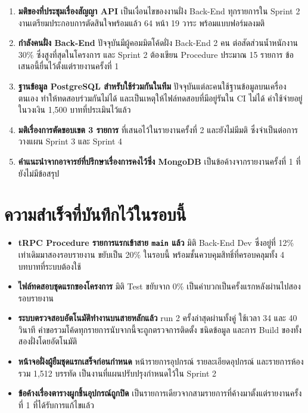 \begin{enumerate}
  \item \textbf{มติของที่ประชุมเรื่องสัญญา API} เป็นเงื่อนไขของงานฝั่ง Back-End ทุกรายการใน Sprint 2 งานเตรียมประกอบการตัดสินใจพร้อมแล้ว 64 หน้า 19 วาระ พร้อมแบบฟอร์มลงมติ
  \item \textbf{กำลังคนฝั่ง Back-End} ปัจจุบันมีผู้คอมมิตโค้ดฝั่ง Back-End 2 คน ต่อสัดส่วนน้ำหนักงาน 30\% ซึ่งสูงที่สุดในโครงการ และ Sprint 2 ต้องเขียน Procedure ประมาณ 15 รายการ ข้อเสนอนี้ยื่นไว้ตั้งแต่รายงานครั้งที่ 1
  \item \textbf{ฐานข้อมูล PostgreSQL สำหรับใช้ร่วมกันในทีม} ปัจจุบันแต่ละคนใช้ฐานข้อมูลบนเครื่องตนเอง ทำให้ทดสอบร่วมกันไม่ได้ และเป็นเหตุให้ไฟล์ทดสอบที่มีอยู่รันใน CI ไม่ได้ ค่าใช้จ่ายอยู่ในวงเงิน 1{,}500 บาทที่ประเมินไว้แล้ว
  \item \textbf{มติเรื่องการตัดขอบเขต 3 รายการ} ที่เสนอไว้ในรายงานครั้งที่ 2 และยังไม่มีมติ ซึ่งจำเป็นต่อการวางแผน Sprint 3 และ Sprint 4
  \item \textbf{คำแนะนำจากอาจารย์ที่ปรึกษาเรื่องการคงไว้ซึ่ง MongoDB} เป็นข้อค้างจากรายงานครั้งที่ 1 ที่ยังไม่มีข้อสรุป
\end{enumerate}

\section{ความสำเร็จที่บันทึกไว้ในรอบนี้}

\begin{itemize}
  \item \textbf{tRPC Procedure รายการแรกเข้าสาย \texttt{main} แล้ว} มิติ Back-End Dev ซึ่งอยู่ที่ 12\% เท่าเดิมมาสองรอบรายงาน ขยับเป็น 20\% ในรอบนี้ พร้อมชั้นควบคุมสิทธิ์ที่ครอบคลุมทั้ง 4 บทบาทที่ระบบต้องใช้
  \item \textbf{ไฟล์ทดสอบชุดแรกของโครงการ} มิติ Test ขยับจาก 0\% เป็นค่าบวกเป็นครั้งแรกหลังผ่านไปสองรอบรายงาน
  \item \textbf{ระบบตรวจสอบอัตโนมัติทำงานบนสายหลักแล้ว} run 2 ครั้งล่าสุดผ่านทั้งคู่ ใช้เวลา 34 และ 40 วินาที คำขอรวมโค้ดทุกรายการนับจากนี้จะถูกตรวจการติดตั้ง ชนิดข้อมูล และการ Build ของทั้งสองฝั่งโดยอัตโนมัติ
  \item \textbf{หน้าจอฝั่งผู้ยืมชุดแรกเสร็จก่อนกำหนด} หน้ารายการอุปกรณ์ รายละเอียดอุปกรณ์ และรายการห้อง รวม 1{,}512 บรรทัด เป็นงานที่แผนปรับปรุงกำหนดไว้ใน Sprint 2
  \item \textbf{ข้อค้างเรื่องตารางผูกชิ้นอุปกรณ์ถูกปิด} เป็นรายการเดียวจากสามรายการที่ค้างมาตั้งแต่รายงานครั้งที่ 1 ที่ได้รับการแก้ไขแล้ว
\end{itemize}

